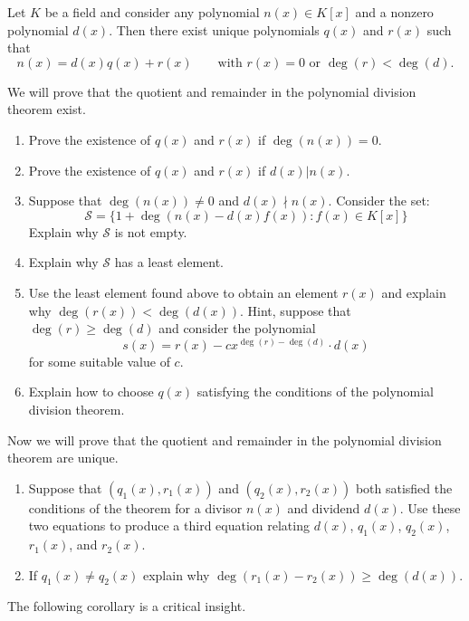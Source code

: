 \documentclass{ximera}
\begin{document}
\begin{theorem}\label{T:divThmPoly}

Let $K$ be a field and consider any polynomial $n(x)\in K[x]$ and a
nonzero polynomial $d(x)$. Then there exist unique polynomials $q(x)$
and $r(x)$ such that
\[
n(x) = d(x) q(x) + r(x) \qquad \text{with $r(x) = 0$ or $\deg(r) <
  \deg(d)$}.
\]
\begin{sketch}
  We will prove that the quotient and remainder in the polynomial
  division theorem exist.
\begin{enumerate}
\item Prove the existence of $q(x)$ and $r(x)$ if $\deg(n(x))=0$.
\item Prove the existence of $q(x)$ and $r(x)$ if $d(x)|n(x)$.
\item Suppose that $\deg(n(x)) \ne 0$ and $d(x)\nmid n(x)$. Consider the set:
\[
\mathcal{S} = \{1+\deg(n(x) -  d(x)f(x)) : f(x)\in K[x]\}
\]
Explain why $\mathcal S$ is not empty.
\item Explain why $\mathcal S$ has a least element.
\item Use the least element found above to obtain an element $r(x)$
  and explain why $\deg(r(x)) < \deg(d(x))$. Hint, suppose that $\deg(r)\ge
  \deg(d)$ and consider the polynomial
  \[
  s(x) = r(x) - cx^{\deg(r)-\deg(d)} \cdot d(x)
  \]
  for some suitable value of $c$.
\item Explain how to choose $q(x)$ satisfying the conditions of the
  polynomial division theorem.
\end{enumerate}

Now we will prove that the quotient and remainder in the polynomial
division theorem are unique.
\begin{enumerate}
\item Suppose that $(q_1(x),r_1(x))$ and $(q_2(x),r_2(x))$ both satisfied the
  conditions of the theorem for a divisor $n(x)$ and dividend
  $d(x)$. Use these two equations to produce a third equation relating
  $d(x)$, $q_1(x)$, $q_2(x)$, $r_1(x)$, and $r_2(x)$.
\item If $q_1(x) \ne q_2(x)$ explain why $\deg(r_1(x) - r_2(x)) \ge \deg(d(x))$.
\end{enumerate}
\end{sketch}
\end{theorem}



The following corollary is a critical insight.
\end{document}
